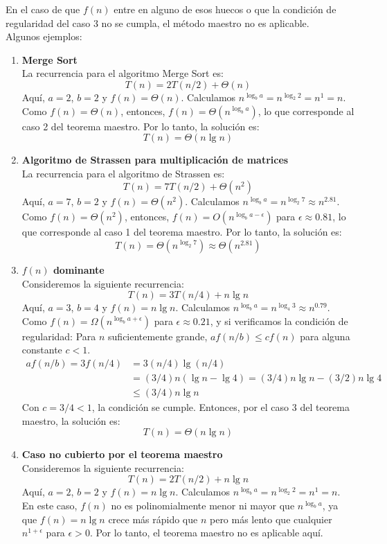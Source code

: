 \documentclass[12pt]{article}
\begin{document}
En el caso de que $f(n)$ entre en alguno de esos huecos o que la condición de regularidad del caso 3 no se cumpla, el método maestro no es aplicable.\\
Algunos ejemplos:
\begin{enumerate}
    \item \textbf{Merge Sort}\\
    La recurrencia para el algoritmo Merge Sort es:
    \[
        T(n) = 2T\left(n/2\right) + \Theta(n)
    \]
    Aquí, $a = 2$, $b = 2$ y $f(n) = \Theta(n)$. Calculamos $n^{\log_b a} = n^{\log_2 2} = n^1 = n$.\\
    Como $f(n) = \Theta(n)$, entonces, $f(n) = \Theta(n^{\log_b a})$, lo que corresponde al caso 2 del teorema maestro. Por lo tanto, la solución es:
    \[
        T(n) = \Theta(n \lg n)
    \]
    \item \textbf{Algoritmo de Strassen para multiplicación de matrices}\\
    La recurrencia para el algoritmo de Strassen es:
    \[
        T(n) = 7T\left(n/2\right) + \Theta(n^2)
    \]
    Aquí, $a = 7$, $b = 2$ y $f(n) = \Theta(n^2)$. Calculamos $n^{\log_b a} = n^{\log_2 7} \approx n^{2.81}$.\\
    Como $f(n) = \Theta(n^2)$, entonces, $f(n) = O(n^{\log_b a - \epsilon})$ para $\epsilon \approx 0.81$, lo que corresponde al caso 1 del teorema maestro. Por lo tanto, la solución es:
    \[
        T(n) = \Theta(n^{\log_2 7}) \approx \Theta(n^{2.81})
    \]
    \item \textbf{$f(n)$ dominante}\\
    Consideremos la siguiente recurrencia:
    \[
        T(n) = 3T\left(n/4\right) + n \lg n
    \]
    Aquí, $a = 3$, $b = 4$ y $f(n) = n \lg n$. Calculamos $n^{\log_b a} = n^{\log_4 3} \approx n^{0.79}$.\\
    Como $f(n) = \Omega(n^{\log_b a + \epsilon})$ para $\epsilon \approx 0.21$, y si verificamos la condición de regularidad: Para $n$ suficientemente grande, $af(n/b) \leq c f(n)$ para alguna constante $c < 1$.
    \begin{align*}
        af(n/b) = 3f(n/4) &= 3(n/4) \lg(n/4)\\
        &= (3/4)n(\lg n - \lg 4) = (3/4)n \lg n - (3/2)n \lg 4\\
        &\leq (3/4)n \lg n
    \end{align*}
    Con $c = 3/4 < 1$, la condición se cumple. Entonces, por el caso 3 del teorema maestro, la solución es:
    \[
        T(n) = \Theta(n \lg n)
    \]
    \item \textbf{Caso no cubierto por el teorema maestro}\\
    Consideremos la siguiente recurrencia:
    \[
        T(n) = 2T\left(n/2\right) + n \lg n
    \]
    Aquí, $a = 2$, $b = 2$ y $f(n) = n \lg n$. Calculamos $n^{\log_b a} = n^{\log_2 2} = n^1 = n$.\\
    En este caso, $f(n)$ no es polinomialmente menor ni mayor que $n^{\log_b a}$, ya que $f(n) = n \lg n$ crece más rápido que $n$ pero más lento que cualquier $n^{1+\epsilon}$ para $\epsilon > 0$. Por lo tanto, el teorema maestro no es aplicable aquí.
\end{enumerate}
\end{document}

